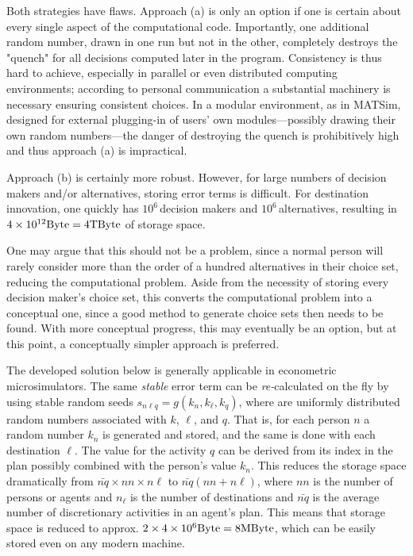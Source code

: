 Both strategies have flaws. Approach (a) is only an option if one is certain about every single aspect of the computational code. Importantly, one additional random number, drawn in one run but not in the other, completely destroys the "quench" for all decisions computed later in the program. Consistency is thus hard to achieve, especially in parallel or even distributed computing environments; according to personal communication a substantial machinery is necessary ensuring consistent choices. In a modular environment, as in MATSim, designed for external plugging-in of users' own modules---possibly drawing their own random numbers---the danger of destroying the quench is prohibitively high and thus approach (a) is impractical.

Approach (b) is certainly more robust. However, for large numbers of decision makers and/or alternatives, storing error terms is difficult. For destination innovation, one quickly has $10^6$\,decision makers and $10^6$\,alternatives, resulting in $4 \times 10^{12} \hbox{Byte} = 4 \hbox{TByte}$ of storage space.

One may argue that this should not be a problem, since a normal person will rarely consider more than the order of a hundred alternatives in their choice set, reducing the computational problem. Aside from the necessity of storing every decision maker's choice set, this converts the computational problem into a conceptual one, since a good method to generate choice sets then needs to be found. With more conceptual progress, this may eventually be an option, but at this point, a conceptually simpler approach is preferred.

The developed solution below is generally applicable in econometric microsimulators. The same \emph{stable} error term can be \emph{re-}calculated on the fly by using stable random seeds $s_{n\ell q} = g(k_n, k_\ell, k_q)$, where are uniformly distributed random numbers associated with $k$, $\ell$, and $q$. That is, for each person $n$ a random number $k_n$ is generated and stored, and the same is done with each destination $\ell$. The value for the activity $q$ can be derived from its index in the plan possibly combined with the person's value $k_n$. This reduces the storage space dramatically from $\bar{nq} \times nn \times n\ell$ to $\bar{nq}(nn + n\ell)$, where $nn$ is the number of persons or agents and $n_\ell$ is the number of destinations and $\bar{nq}$ is the average number of discretionary activities in an agent's plan. This means that storage space is reduced to approx. $2 \times 4 \times 10^{6} \hbox{Byte} = 8 \hbox{MByte}$, which can be easily stored even on any modern machine.

